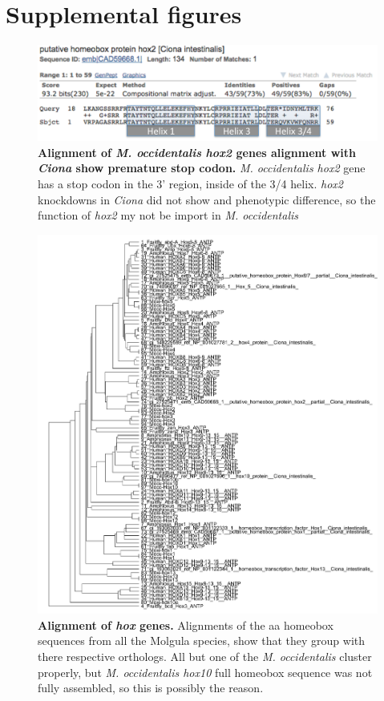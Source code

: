 \chapter{Supplemental figures}
\begin{figure}[thbp]
\centering
\includegraphics[scale=0.75]{figures/occi_hox2.pdf}
\caption{\textbf{Alignment of \textit{M. occidentalis} \textit{hox2} genes alignment with \textit{Ciona} show  premature stop codon.} \textit{M. occidentalis hox2} gene has a stop codon in the 3' region, inside of the 3/4 helix. \textit{hox2} knockdowns in \textit{Ciona} did not show and phenotypic difference, so the function of \textit{hox2} my not be import in \textit{M. occidentalis} }
\label{fig:occihox2}
\end{figure}

\begin{figure}[tbp]
\centering
\includegraphics[scale=0.85]{figures/hox_alignment.pdf}
\caption{\textbf{Alignment of \textit{hox} genes.} Alignments of the aa homeobox sequences from all the Molgula species, show that they group with there respective orthologs. All but one of the \textit{M. occidentalis} cluster properly, but \textit{M. occidentalis hox10} full homeobox sequence was not fully assembled, so this is possibly the reason. }
\label{fig:hox-alignments}
\end{figure}


